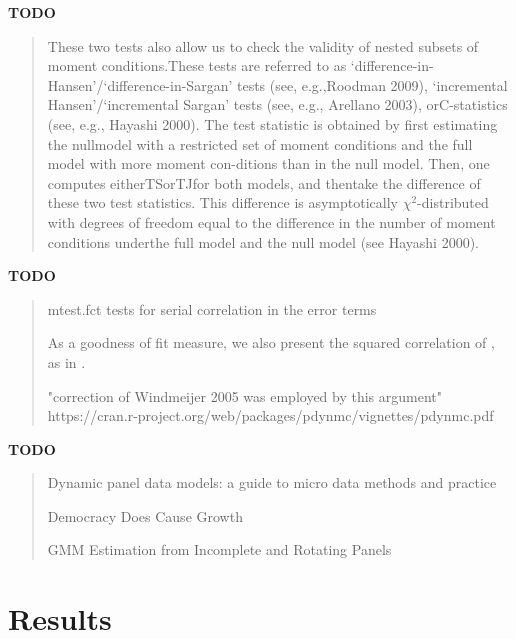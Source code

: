 \documentclass[12pt,a4paper]{article}
\begin{document}
\vspace{1cm}
\noindent\textbf{TODO}
\begin{quote}
\cite{roodmanNoteThemeToo2009}
These two tests also allow us to check the validity of nested subsets of moment conditions.These  tests  are  referred  to  as  `difference-in-Hansen'/`difference-in-Sargan'  tests  (see,  e.g.,Roodman 2009), ‘incremental Hansen’/‘incremental Sargan’ tests (see, e.g., Arellano 2003), orC-statistics (see, e.g., Hayashi 2000).  
The test statistic is obtained by first estimating the nullmodel with a restricted set of moment conditions and the full model with more moment con-ditions than in the null model.  Then, one computes eitherTSorTJfor both models, and thentake the difference of these two test statistics.  This difference is asymptotically $\chi^2$-distributed with degrees of freedom equal to the difference in the number of moment conditions underthe full model and the null model (see Hayashi 2000).
\end{quote}

\vspace{1cm}
\noindent\textbf{TODO}
\begin{quote}
mtest.fct tests for serial correlation in the error terms \cite{arellanoTestsSpecificationPanel1991}


As a goodness of fit measure, we also present the squared correlation of , as in \cite{bloomUncertaintyInvestmentDynamics2007}.


"correction of Windmeijer 2005 was employed by this argument" https://cran.r-project.org/web/packages/pdynmc/vignettes/pdynmc.pdf
\end{quote}

\vspace{1cm}
\noindent\textbf{TODO}
\begin{quote}\cite{petrovicUnderlyingCausalFactors2018}
Dynamic panel data models: a guide to micro data methods and practice \cite{bondDynamicPanelData2002}


Democracy Does Cause Growth \cite{acemogluDemocracyDoesCause2019}


GMM Estimation from Incomplete and Rotating Panels \cite{albarranGMMEstimationIncomplete2019}
\end{quote}

\section{Results}\label{sec:results}
\end{document}
